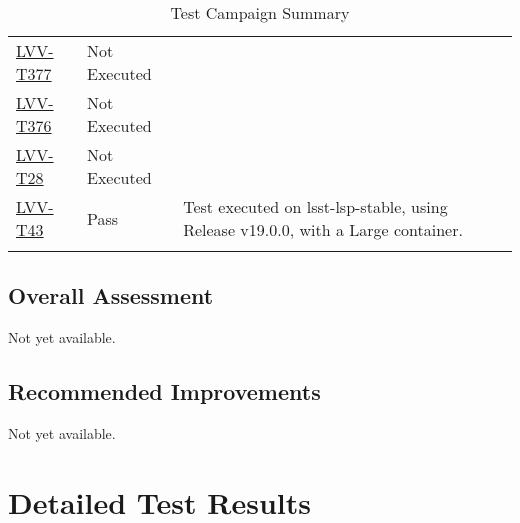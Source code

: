 \documentclass[DM,lsstdraft,STR,toc]{lsstdoc}
\begin{document}
\begin{longtable}{p{2cm}p{2.5cm}p{9cm}p{2.5cm}}
\begin{minipage}[]{9cm}
    \medskip
    \end{minipage}
    &
    \\\hline
\href{https://jira.lsstcorp.org/secure/Tests.jspa#/testCase/LVV-T377}{LVV-T377}
    & Not Executed &
    \begin{minipage}[]{9cm}
    \smallskip
    
    \medskip
    \end{minipage}
    &
    \\\hline
\href{https://jira.lsstcorp.org/secure/Tests.jspa#/testCase/LVV-T376}{LVV-T376}
    & Not Executed &
    \begin{minipage}[]{9cm}
    \smallskip
    
    \medskip
    \end{minipage}
    &
    \\\hline
\href{https://jira.lsstcorp.org/secure/Tests.jspa#/testCase/LVV-T28}{LVV-T28}
    & Not Executed &
    \begin{minipage}[]{9cm}
    \smallskip
    
    \medskip
    \end{minipage}
    &
    \\\hline
\href{https://jira.lsstcorp.org/secure/Tests.jspa#/testCase/LVV-T43}{LVV-T43}
    & Pass &
    \begin{minipage}[]{9cm}
    \smallskip
     Test executed on lsst-lsp-stable, using Release v19.0.0, with a Large
container.

    \medskip
    \end{minipage}
    &
    \\\hline
\caption{Test Campaign Summary}
\label{table:summary}
\end{longtable}

\subsection{Overall Assessment}
\label{sect:overallassessment}

Not yet available.

\subsection{Recommended Improvements}
\label{sect:recommendations}

Not yet available.

\newpage
\section{Detailed Test Results}
\label{sect:detailedtestresults}
\end{document}
